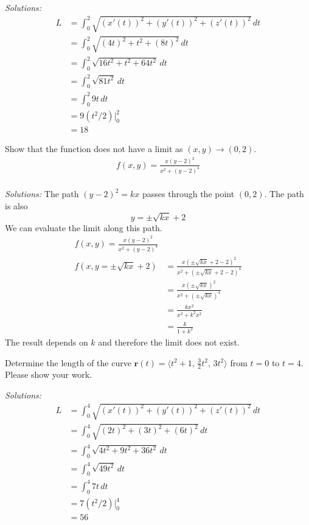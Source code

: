 \ifnum {} {\color{DarkBlue} \textit{Solutions:} 
\begin{align*}
    L &= \int_0^2 \sqrt{(x'(t))^2+(y'(t))^2+(z'(t))^2} \, dt \\
    &= \int_0^2 \sqrt{(4t)^2 + t^2+(8t)^2} \, dt \\
    &= \int_0^2 \sqrt{16t^2 + t^2+64t^2} \, dt \\
    &= \int_0^2 \sqrt{81t^2} \, dt \\
    &= \int_0^2 9t \, dt \\
    &= 9(t^2/2)\big|_0^2\\ 
    &= 18
\end{align*}
\newpage
}
\else
\vspace{9cm}
\fi
\fi


\ifnum {}
\question[4] Show that the function does not have a limit as $(x,y) \to (0,2)$.  
    \begin{align*}
        f(x,y) = \frac{x(y-2)^2}{x^2 +(y-2)^4}
    \end{align*}
\ifnum {} {\color{DarkBlue} \\ \textit{Solutions:} 
    The path $(y-2)^2=kx$ passes through the point $(0,2)$. The path is also
    $$y=\pm\sqrt{kx}+2$$
    We can evaluate the limit along this path. 
    \begin{align}
        f(x,y) = \frac{x(y-2)^2}{x^2 +(y-2)^4}\\
        f(x,y=\pm\sqrt{kx}+2)
        &= \frac{x(\pm\sqrt{kx}+2-2)^2}{x^2 +(\pm\sqrt{kx}+2-2)^4} \\
        &= \frac{x(\pm\sqrt{kx})^2}{x^2 +(\pm\sqrt{kx})^4} \\
        &= \frac{kx^2}{x^2 +k^2x^2}  \\
        &= \frac{k}{1 +k^2}  
    \end{align}
    The result depends on $k$ and therefore the limit does not exist. 
    } 
   \else
    \vspace{6cm}
      
   \fi
    
\fi




\ifnum {}
\question[4] Determine the length of the curve $\mathbf r(t) = \langle t^2+1, \, \frac32t^2, \, 3t^2 \rangle$ from $t=0$ to $t=4$. Please show your work. 

\ifnum {} {\color{DarkBlue} \textit{Solutions:} 
\begin{align*}
    L &= \int_0^4 \sqrt{(x'(t))^2+(y'(t))^2+(z'(t))^2} \, dt \\
    &= \int_0^4 \sqrt{(2t)^2 + (3t)^2+(6t)^2} \, dt \\
    &= \int_0^4 \sqrt{4t^2 + 9t^2+36t^2} \, dt \\
    &= \int_0^4 \sqrt{49t^2} \, dt \\
    &= \int_0^4 7t \, dt \\
    &= 7(t^2/2)\big|_0^4\\ 
    &= 56
\end{align*}
\newpage
}
\else
\vspace{9cm}
\fi
\fi





